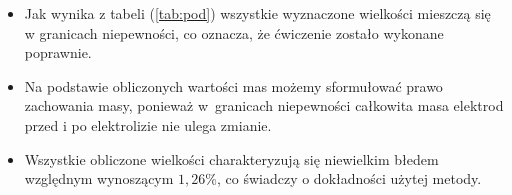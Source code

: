 \documentclass [a4paper,11pt]{article}
\begin{document}
	\begin{itemize}
		\item Jak wynika z tabeli (\ref{tab:pod}) wszystkie wyznaczone wielkości mieszczą się w granicach niepewności, co oznacza, że ćwiczenie zostało wykonane poprawnie.
		\item Na podstawie obliczonych wartości mas możemy sformułować prawo zachowania masy, ponieważ w~granicach niepewności całkowita masa elektrod przed i po elektrolizie nie ulega zmianie. 
		\item Wszystkie obliczone wielkości charakteryzują się niewielkim błedem względnym wynoszącym $1,26$\%, co świadczy o dokładności użytej metody.
	\end{itemize}
\end{document}
